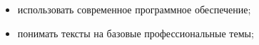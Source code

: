 \begin{itemize}
    \item использовать современное программное обеспечение;
    \item понимать тексты на базовые профессиональные темы;
\end{itemize}

